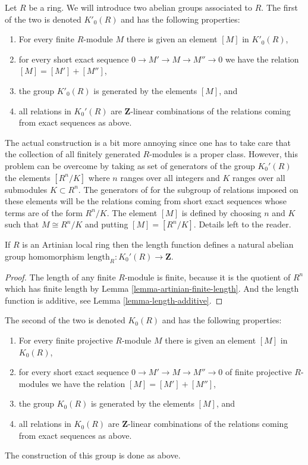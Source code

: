 \noindent
Let $R$ be a ring. We will introduce two abelian groups associated
to $R$. The first of the two is denoted $K'_0(R)$ and has the following
properties:
\begin{enumerate}
\item For every finite $R$-module $M$ there is given an element $[M]$ in
$K'_0(R)$,
\item for every short exact sequence $0 \to M' \to M \to M'' \to 0$
we have the relation $[M] = [M'] + [M'']$,
\item the group $K'_0(R)$ is generated by the elements $[M]$, and
\item all relations in $K_0'(R)$ are $\mathbf{Z}$-linear combinations
of the relations coming from exact sequences as above.
\end{enumerate}
The actual construction is a bit more annoying since one has to take care
that the collection of all finitely generated $R$-modules is a proper class.
However, this problem can be overcome by taking as set of generators
of the group $K_0'(R)$ the elements $[R^n/K]$ where $n$ ranges over
all integers and $K$ ranges over all submodules $K \subset R^n$.
The generators of for the subgroup of relations imposed on these elements
will be the relations coming from short exact sequences whose terms
are of the form $R^n/K$. The element $[M]$ is defined by
choosing $n$ and $K$ such that $M \cong R^n/K$ and putting
$[M] = [R^n/K]$. Details left to the reader.

\begin{lemma}
\label{lemma-length-K0}
If $R$ is an Artinian local ring then the length function
defines a natural abelian group homomorphism
$\text{length}_R : K_0'(R) \to \mathbf{Z}$.
\end{lemma}

\begin{proof}
The length of any finite $R$-module is finite,
because it is the quotient of $R^n$ which has finite length by
Lemma \ref{lemma-artinian-finite-length}. And the length function
is additive, see Lemma \ref{lemma-length-additive}.
\end{proof}

\noindent
The second of the two is denoted $K_0(R)$ and has the following
properties:
\begin{enumerate}
\item For every finite projective $R$-module $M$ there
is given an element $[M]$ in $K_0(R)$,
\item for every short exact sequence $0 \to M' \to M \to M'' \to 0$
of finite projective $R$-modules we have the relation $[M] = [M'] + [M'']$,
\item the group $K_0(R)$ is generated by the elements $[M]$, and
\item all relations in $K_0(R)$ are $\mathbf{Z}$-linear combinations
of the relations coming from exact sequences as above.
\end{enumerate}
The construction of this group is done as above.

